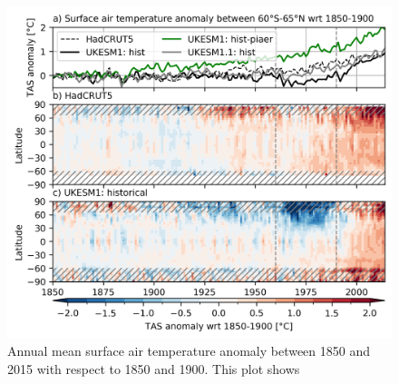 \begin{figure}
    \centering
    \includegraphics{Appendix1/figs/TAS_anomaly_all.png}
    \caption{Annual mean surface air temperature anomaly between 1850 and 2015 with respect to 1850 and 1900. This plot shows}
    \label{fig:app1:seasonal-emiso2-1850}
\end{figure}

